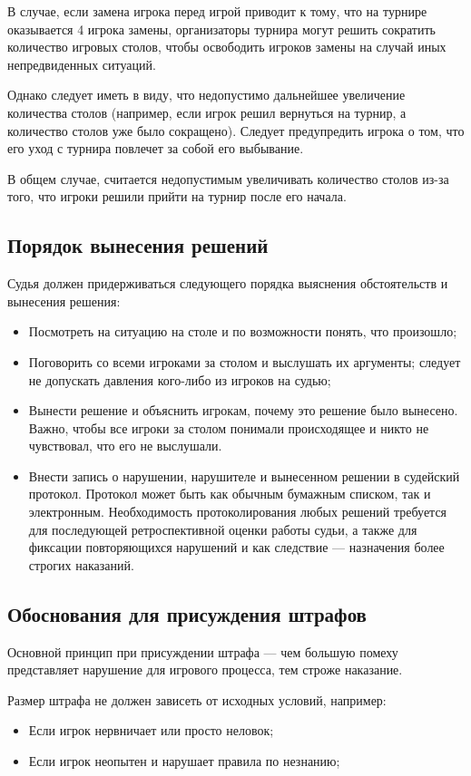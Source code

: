 В случае, если замена игрока перед игрой приводит к тому, что на турнире оказывается 4 игрока замены, организаторы турнира могут решить сократить количество игровых столов, чтобы освободить игроков замены на случай иных непредвиденных ситуаций.

Однако следует иметь в виду, что недопустимо дальнейшее увеличение количества столов (например, если игрок решил вернуться на турнир, а количество столов уже было сокращено). Следует предупредить игрока о том, что его уход с турнира повлечет за собой его выбывание.

В общем случае, считается недопустимым увеличивать количество столов из-за того, что игроки решили прийти на турнир после его начала.

\subsection{Порядок вынесения решений}

Судья должен придерживаться следующего порядка выяснения обстоятельств и вынесения решения:
\begin{itemize}
	\item Посмотреть на ситуацию на столе и по возможности понять, что произошло;
	\item Поговорить со всеми игроками за столом и выслушать их аргументы; следует не допускать давления кого-либо из игроков на судью;
	\item Вынести решение и объяснить игрокам, почему это решение было вынесено. Важно, чтобы все игроки за столом понимали происходящее и никто не чувствовал, что его не выслушали.
	\item Внести запись о нарушении, нарушителе и вынесенном решении в судейский протокол. Протокол может быть как обычным бумажным списком, так и электронным. Необходимость протоколирования любых решений требуется для последующей ретроспективной оценки работы судьи, а также для фиксации повторяющихся нарушений и как следствие --- назначения более строгих наказаний.
\end{itemize}

\subsection{Обоснования для присуждения штрафов}

Основной принцип при присуждении штрафа --- чем большую помеху представляет нарушение для игрового процесса, тем строже наказание.

Размер штрафа не должен зависеть от исходных условий, например:
\begin{itemize}
	\item Если игрок нервничает или просто неловок;
	\item Если игрок неопытен и нарушает правила по незнанию;
\end{itemize}

